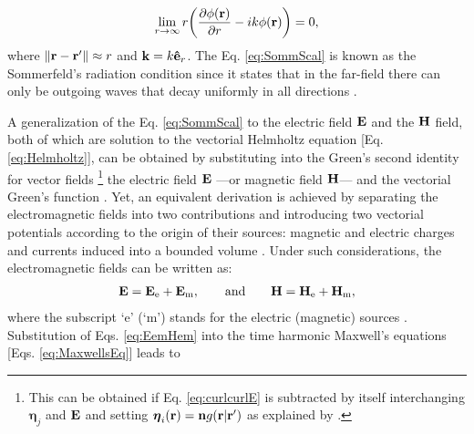 %
%
%
%
\begin{align}
    \lim_{r\to \infty} r\qty(\pdv{\phi(\vb{r})}{r} - ik\phi(\vb{r})) = 0,
    \label{eq:SommScal}
\end{align}
%
where $\norm{\vb{r}-\vb{r}'} \approx r$ and $\vb{k} = k \vu{e}_r$. The Eq. \eqref{eq:SommScal} is known as the Sommerfeld's radiation condition since it states that in the far-field there can only be outgoing waves that decay uniformly in all directions \cite{schot_eighty_1992,jin_theory_2010,bondeson_computational_2005}.

A generalization of the Eq. \eqref{eq:SommScal} to the electric field $\vb{E}$ and the $\vb{H}$ field, both of which are solution to the vectorial Helmholtz equation [Eq. \eqref{eq:Helmholtz}], can be obtained by substituting into the Green's second identity for vector fields%
	\footnote{%
    This can be obtained if  Eq. \eqref{eq:curlcurlE} is subtracted by itself interchanging $\boldsymbol{\eta}_j $ and $\vb{E}$ and setting $\boldsymbol{\eta}_i(\vb{r}) = \vb{n}g(\vb{r}|\vb{r}')$ as explained by \citeauthor{stratton_diffraction_1939} \cite{stratton_diffraction_1939}.}%
    the electric field  $\vb{E}$ ---or magnetic field $\vb{H}$--- and the vectorial Green's function \cite{schot_eighty_1992,silver_microwave_1984,colton_inverse_2019}. Yet, an equivalent derivation is achieved by separating the electromagnetic fields into two contributions and introducing  two vectorial potentials according to the origin of their sources: magnetic and electric  charges and currents induced into a bounded volume \cite{jin_theory_2010,bondeson_computational_2005}. Under such considerations, the electromagnetic fields can be written as:
%
\begin{align}
\vb{E} = \vb{E}_\text{e} + \vb{E}_\text{m},
    \qquad
    \text{and}
    \qquad
\vb{H} = \vb{H}_\text{e} + \vb{H}_\text{m},
\label{eq:EemHem}
\end{align}
%
where the subscript `e' (`m') stands for the electric (magnetic) sources \cite{jin_theory_2010}. Substitution of Eqs. \eqref{eq:EemHem} into the time harmonic Maxwell's equations [Eqs. \eqref{eq:MaxwellsEq}] leads to
%
%
%
